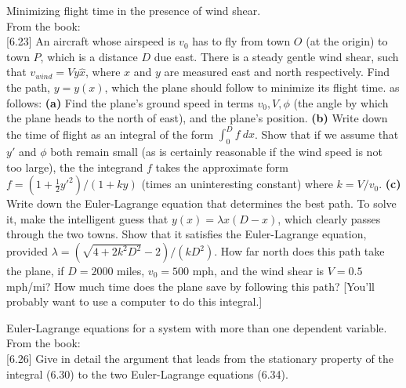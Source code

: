 \documentclass[11pt,letterpaper,boxed]{../hmcpset}
\newcommand{\half}{\frac{1}{2}}
\begin{document}
\begin{problem}[6.23]
Minimizing flight time in the presence of wind shear.\\
From the book:\\

[6.23] An aircraft whose airspeed is $v_0$ has to fly from town $O$ (at the origin) to town $P$, which is a distance $D$ due east. There is a steady gentle wind shear, such that $v_{wind} = V y \hat x$, where $x$ and $y$ are measured east and north respectively. Find the path, $y = y(x)$, which the plane should follow to minimize its flight time. as follows: \textbf{(a)} Find the plane's ground speed in terms $v_0, V, \phi$ (the angle by which the plane heads to the north of east), and the plane's position. \textbf{(b)} Write down the time of flight as an integral of the form $\int_0^D f \ dx$. Show that if we assume that $y'$ and $\phi$ both remain small (as is certainly reasonable if the wind speed is not too large), the the integrand $f$ takes the approximate form $f = (1 + \half {y'}^2)/(1 + ky)$ (times an uninteresting constant) where $k = V/v_0$. \textbf{(c)} Write down the Euler-Lagrange equation that determines the best path. To solve it, make the intelligent guess that $y(x) = \lambda x(D-x)$, which clearly passes through the two towns. Show that it satisfies the Euler-Lagrange equation, provided $\lambda = (\sqrt{4 + 2k^2 D^2} -2)/(kD^2)$. How far north does this path take the plane, if $D = 2000$ miles, $v_0 = 500$ mph, and the wind shear is $V = 0.5$ mph/mi? How much time does the plane save by following this path? [You'll probably want to use a computer to do this integral.]

\end{problem}
\begin{solution}


\vfill
\end{solution}

\newpage

\begin{problem}[6.26]
Euler-Lagrange equations for a system with more than one dependent variable.\\
From the book:\\

[6.26] Give in detail the argument that leads from the stationary property of the integral (6.30) to the two Euler-Lagrange equations (6.34).
\end{problem}
\begin{solution}


\vfill
\end{solution}
\end{document}
